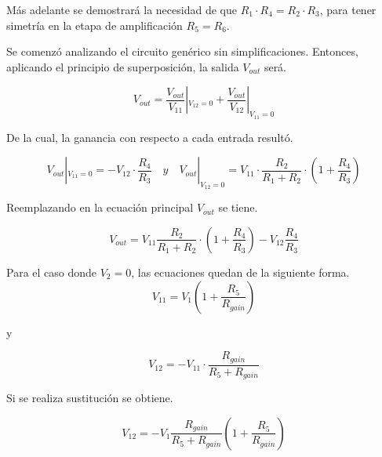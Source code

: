 \documentclass[12pt,A4paper,titlepage]{article}
\begin{document}
\hspace{1mm} Más adelante se demostrará la necesidad de que \(R_1 \cdot R_4 = R_2 \cdot R_3\), para tener simetría en la etapa de amplificación \(R_5 = R_6\).

\bigskip
\hspace{1mm} Se comenzó analizando el circuito genérico sin simplificaciones. Entonces, aplicando el principio de superposición, la salida \(V_{out}\) será.

\bigskip
\begin{equation}
\label{superp}
V_{out} = \frac{V_{out}}{V_{11}} |_{V_{12} = 0} + \frac{V_{out}}{V_{12}}|_{V_{11}=0}
\end{equation}

\bigskip
\hspace{1mm} De la cual, la ganancia con respecto a cada entrada resultó.

\begin{equation}
  V_{out}|_{V_{11}=0} = -V_{12} \cdot \frac{R_4}{R_3} \quad y \quad   V_{out}|_{V_{12}=0} = V_{11} \cdot \frac{R_2}{R_1 + R_2} 
\cdot \left(1+\frac{R_4}{R_3}\right)
\end{equation}

\bigskip

\hspace{1mm} Reemplazando en la ecuación principal \(V_{out}\) se tiene.

\bigskip

\begin{equation}
    V_{out} = V_{11} \frac{R_2}{R_1 + R_2} \cdot \left(1 + \frac{R_4}{R_3}\right) - V_{12} \frac{R_4}{R_3}
\end{equation}

\bigskip
\hspace{1mm} Para el caso donde \(V_2 = 0\), las ecuaciones quedan de la siguiente forma.
\bigskip
\begin{equation}
    V_{11} = V_1 \left(1 + \frac{R_5}{R_{gain}}\right)
\end{equation}

y

\begin{equation}
    V_{12} = -V_{11} \cdot \frac{R_{gain}}{R_5 + R_{gain}}
\end{equation}

\bigskip
\hspace{1mm} Si se realiza sustitución se obtiene.

\begin{equation}
    V_{12} = -V_1 \frac{R_{gain}}{R_5 + R_{gain}} \left(1 + \frac{R_5}{R_{gain}}\right)
\end{equation}
\end{document}

